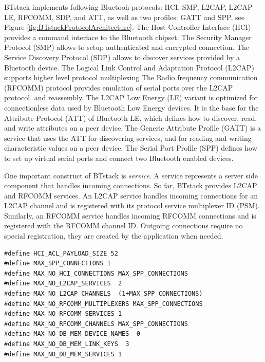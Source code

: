 \documentclass[a4paper,titlepage,oneside,12pt]{amsart} %
\newcommand{\toread}[1]{{\color{bklightblue} #1}}
\begin{document}
\toread{BTstack implements following Bluetooh protocols: HCI, SMP, L2CAP, L2CAP-LE, RFCOMM, SDP, and ATT, as well as two profiles: GATT and SPP, see Figure \ref{fig:BTstackProtocolArchitecture}. 
The Host Controller Interface (HCI) provides a command interface to the Bluetooth chipset. 
The Security Manager Protocol (SMP) allows to setup authenticated and encrypted connection.
The Service Discovery Protocol (SDP) allows to discover services provided by a Bluetooth device. 
The Logical Link Control and Adaptation Protocol (L2CAP) supports higher level protocol multiplexing %
The Radio frequency communication (RFCOMM) protocol provides emulation of serial ports over the L2CAP protocol.
and reassembly. 
The L2CAP Low Energy (LE) variant is optimized for connectionless data used by Bluetooth Low Energy devices. It is the base for the Attribute Protocol (ATT) of Bluetooth LE, which defines how to discover, read, and write attributes on a peer device. %
The Generic Attribute Profile (GATT) is a service that uses the ATT for discovering services, and for reading and writing characteristic values on a peer device. 
The Serial Port Profile (SPP) defines how to set up virtual serial ports and connect two Bluetooth enabled devices. }


One important construct of BTstack is \emph{service}. A service represents a server side component that handles incoming connections. So far, BTstack provides L2CAP and RFCOMM services. An L2CAP service handles incoming connections for an L2CAP channel and is registered with its protocol service multiplexer ID (PSM). Similarly,  an RFCOMM service handles incoming RFCOMM connections and is registered with the RFCOMM channel ID. Outgoing connections require no special registration, they are created by the application when needed. 

\noindent\begin{minipage}{\textwidth}
\begin{lstlisting}[caption=Memory configuration for an SPP service with a minimal L2CAP MTU., label=memoryConfigurationSPP]
#define HCI_ACL_PAYLOAD_SIZE 52
#define MAX_SPP_CONNECTIONS 1
#define MAX_NO_HCI_CONNECTIONS MAX_SPP_CONNECTIONS
#define MAX_NO_L2CAP_SERVICES  2
#define MAX_NO_L2CAP_CHANNELS  (1+MAX_SPP_CONNECTIONS)
#define MAX_NO_RFCOMM_MULTIPLEXERS MAX_SPP_CONNECTIONS
#define MAX_NO_RFCOMM_SERVICES 1
#define MAX_NO_RFCOMM_CHANNELS MAX_SPP_CONNECTIONS
#define MAX_NO_DB_MEM_DEVICE_NAMES  0
#define MAX_NO_DB_MEM_LINK_KEYS  3
#define MAX_NO_DB_MEM_SERVICES 1
\end{lstlisting}
\end{minipage}
\end{document}
